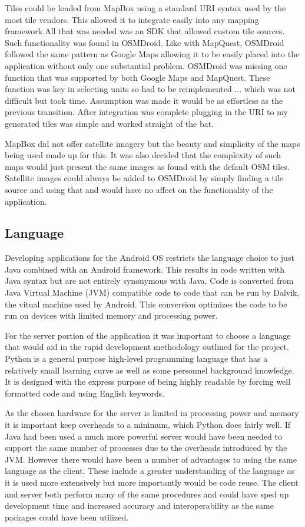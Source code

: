 Tiles could be loaded from MapBox using a standard URI syntax used by the most tile vendors. This allowed it to integrate easily into any mapping framework.All that was needed was an SDK that allowed custom tile sources. Such functionality was found in OSMDroid. Like with MapQuest, OSMDroid followed the same pattern as Google Maps allowing it to be easily placed into the application without only one substantial problem. OSMDroid was missing one function that was supported by both Google Maps and MapQuest. These function was key in selecting units so had to be reimplemented ... which was not difficult but took time. Assumption was made it would be as effortless as the previous transition. After integration was complete plugging in the URI to my generated tiles was simple and worked straight of the bat.

MapBox did not offer satellite imagery but the beauty and simplicity of the maps being used made up for this. It was also decided that the complexity of such maps would just present the same images as found with the default OSM tiles. Satellite images could always be added to OSMDroid by simply finding a tile source and using that and would have no affect on the functionality of the application. 


\subsection{Language}
Developing applications for the Android OS restricts the language choice to just Java combined with an Android framework. This results in code written with Java syntax but are not entirely synonymous with Java. Code is converted from Java Virtual Machine (JVM) compatible code to code that can be run by Dalvik, the vitual machine used by Android. This conversion optimizes the code to be run on devices with limited memory and processing power.

For the server portion of the application it was important to choose a language that would aid in the rapid development methodology outlined for the project. Python is a general purpose high-level programming language that has a relatively small learning curve as well as some personnel background knowledge. It is designed with the express purpose of being highly readable by forcing well formatted code and using English keywords. 

As the chosen hardware for the server is limited in processing power and memory it is important keep overheads to a minimum, which Python does fairly well. If Java had been used a much more powerful server would have been needed to support the same number of processes due to the overheads introduced by the JVM. However there would have been a number of advantages to using the same language as the client. These include a greater understanding of the language as it is used more extensively but more importantly would be code reuse. The client and server both perform many of the same procedures and could have sped up development time and increased accuracy and interoperability as the same packages could have been utilized.

